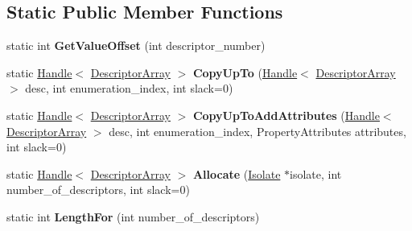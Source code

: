\subsection*{Static Public Member Functions}
\begin{DoxyCompactItemize}
\item 
\hypertarget{classv8_1_1internal_1_1_descriptor_array_a876b8f24ff519e21c86f03ddcc5ef6e7}{}static int {\bfseries Get\+Value\+Offset} (int descriptor\+\_\+number)\label{classv8_1_1internal_1_1_descriptor_array_a876b8f24ff519e21c86f03ddcc5ef6e7}

\item 
\hypertarget{classv8_1_1internal_1_1_descriptor_array_a3dbea7e3516fe8d5f48f68b33c265111}{}static \hyperlink{classv8_1_1internal_1_1_handle}{Handle}$<$ \hyperlink{classv8_1_1internal_1_1_descriptor_array}{Descriptor\+Array} $>$ {\bfseries Copy\+Up\+To} (\hyperlink{classv8_1_1internal_1_1_handle}{Handle}$<$ \hyperlink{classv8_1_1internal_1_1_descriptor_array}{Descriptor\+Array} $>$ desc, int enumeration\+\_\+index, int slack=0)\label{classv8_1_1internal_1_1_descriptor_array_a3dbea7e3516fe8d5f48f68b33c265111}

\item 
\hypertarget{classv8_1_1internal_1_1_descriptor_array_ac84a052a1341d4c0ece48bfc166379c7}{}static \hyperlink{classv8_1_1internal_1_1_handle}{Handle}$<$ \hyperlink{classv8_1_1internal_1_1_descriptor_array}{Descriptor\+Array} $>$ {\bfseries Copy\+Up\+To\+Add\+Attributes} (\hyperlink{classv8_1_1internal_1_1_handle}{Handle}$<$ \hyperlink{classv8_1_1internal_1_1_descriptor_array}{Descriptor\+Array} $>$ desc, int enumeration\+\_\+index, Property\+Attributes attributes, int slack=0)\label{classv8_1_1internal_1_1_descriptor_array_ac84a052a1341d4c0ece48bfc166379c7}

\item 
\hypertarget{classv8_1_1internal_1_1_descriptor_array_a48a10144387880a780e47fd0553b4503}{}static \hyperlink{classv8_1_1internal_1_1_handle}{Handle}$<$ \hyperlink{classv8_1_1internal_1_1_descriptor_array}{Descriptor\+Array} $>$ {\bfseries Allocate} (\hyperlink{classv8_1_1internal_1_1_isolate}{Isolate} $\ast$isolate, int number\+\_\+of\+\_\+descriptors, int slack=0)\label{classv8_1_1internal_1_1_descriptor_array_a48a10144387880a780e47fd0553b4503}

\item 
\hypertarget{classv8_1_1internal_1_1_descriptor_array_a181ace210a7829d08ca133afcceb8ea5}{}static int {\bfseries Length\+For} (int number\+\_\+of\+\_\+descriptors)\label{classv8_1_1internal_1_1_descriptor_array_a181ace210a7829d08ca133afcceb8ea5}

\end{DoxyCompactItemize}
